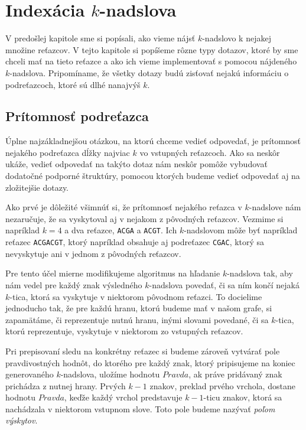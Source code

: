 \chapter{Indexácia $k$-nadslova}

V predošlej kapitole sme si popísali, ako vieme nájsť $k$-nadslovo k nejakej
množine reťazcov. V tejto kapitole si popíšeme rôzne typy dotazov, ktoré by
sme chceli mať na tieto reťazce a ako ich vieme implementovať s pomocou
nájdeného $k$-nadslova. Pripomíname, že všetky dotazy budú zisťovať nejakú
informáciu o podreťazcoch, ktoré sú dlhé nanajvýš $k$.

\section{Prítomnosť podreťazca}

Úplne najzákladnejšou otázkou, na ktorú chceme vedieť odpovedať, je prítomnosť
nejakého podreťazca dĺžky najviac $k$ vo vstupných reťazcoch. Ako sa neskôr ukáže,
vedieť odpovedať na takýto dotaz nám neskôr pomôže vybudovať dodatočné podporné
štruktúry, pomocou ktorých budeme vedieť odpovedať aj na zložitejšie dotazy.

Ako prvé je dôležité všimnúť si, že prítomnosť nejakého reťazca v $k$-nadslove
nám nezaručuje, že sa vyskytoval aj v nejakom z pôvodných reťazcov. Vezmime si
napríklad $k = 4$ a dva reťazce, \texttt{ACGA} a \texttt{ACGT}. Ich $k$-nadslovom
môže byť napríklad reťazec \texttt{ACGACGT}, ktorý napríklad obsahuje aj
podreťazec \texttt{CGAC}, ktorý sa nevyskytuje ani v jednom z pôvodných reťazcov.

Pre tento účel mierne modifikujeme algoritmus na hľadanie $k$-nadslova tak, aby nám
vedel pre každý znak výsledného $k$-nadslova povedať, či sa ním končí nejaká $k$-tica,
ktorá sa vyskytuje v niektorom pôvodnom reťazci. To docielime jednoducho tak, že
pre každú hranu, ktorú budeme mať v našom grafe, si zapamätáme, či reprezentuje
nutnú hranu, inými slovami povedané, či sa $k$-tica, ktorú reprezentuje, vyskytuje
v niektorom zo vstupných reťazcov.

Pri prepisovaní sledu na konkrétny reťazec si budeme zároveň vytvárať pole
pravdivostných hodnôt, do ktorého pre každý znak, ktorý pripisujeme na koniec
generovaného $k$-nadslova, uložíme hodnotu $Pravda$, ak práve pridávaný znak
prichádza z nutnej hrany. Prvých $k-1$ znakov, preklad prvého vrchola, dostane
hodnotu $Pravda$, keďže každý vrchol predstavuje $k-1$-ticu znakov, ktorá sa
nachádzala v niektorom vstupnom slove. Toto pole budeme nazývať \emph{poľom výskytov}.

